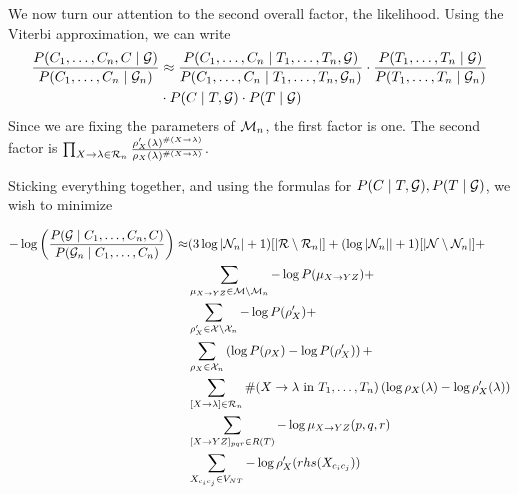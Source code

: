 \documentclass{article}
\begin{document}
We now turn our attention to the second overall factor, the
likelihood.  Using the Viterbi approximation, we can write
\begin{align*}
\frac{P(C_1,\dots,C_n, C\mid {\mathcal G})}{P(C_1,\dots,C_n \mid {\mathcal G}_n)}
& \approx
\frac{P(C_1,\dots,C_n \mid T_1,\dots, T_n, {\mathcal G})}{P(C_1,\dots,C_n \mid T_1,\dots, T_n, {\mathcal G}_n)}
\cdot
\frac{P(T_1,\dots,T_n \mid  {\mathcal G})}{P(T_1,\dots,T_n \mid  {\mathcal G}_n)} \\
& 
\cdot
P(C\mid T, {\mathcal G})
\cdot
P(T\mid {\mathcal G})
\end{align*}
Since we are fixing the parameters of ${\mathcal M}_n$, the first factor is
one. The second factor is $\prod_{X\to \lambda\in {\mathcal R}_n}
\frac{\rho'_X(\lambda)^{\#(X\to \lambda)}}{\rho_X(\lambda)^{\#(X\to
    \lambda)}}$.

Sticking everything together, and using the formulas for $P(C\mid T,
{\mathcal G}), P(T\mid {\mathcal G})$, we wish to minimize

\begin{align*}
-\log\left(
\frac{P({\mathcal G} \mid C_1, \dots, C_n, C)}{P({\mathcal G}_n\mid C_1, \dots, C_n)}
\right) 
\approx&
(3 \log |{\mathcal N}_n| + 1)[|{\mathcal R} \setminus {\mathcal R}_n|] + 
(\log|{\mathcal N}_n|| + 1) [|{\mathcal N} \setminus {\mathcal N}_n|] + \\
& \sum_{\mu_{X\to YZ}\in {\mathcal M}\setminus {\mathcal M}_n} -\log P(\mu_{X\to YZ}) +\\
& \sum_{\rho'_X\in {\mathcal X} \setminus {\mathcal X}_n} -\log P(\rho'_X) +\\
& \sum_{\rho_X \in {\mathcal X}_n} \left(\log P(\rho_X) -\log P(\rho'_X)\right) + \\
& \sum_{[X\to \lambda]\in {\mathcal R}_n} \#(X\to \lambda\text{ in } T_1,\dots,T_n)
\left( \log \rho_X(\lambda) - \log \rho'_X(\lambda) \right) \\
& \sum_{[X\to YZ]_{pqr}\in R(T)} -\log \mu_{X\to YZ}(p,q,r) \\
& \sum_{X_{c_i c_j}\in V_{NT}} -\log\rho'_{X}(rhs(X_{c_i c_j}))
\end{align*}
\end{document}
